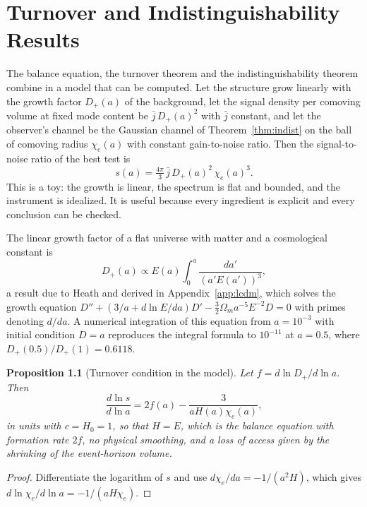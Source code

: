 \documentclass[11pt,oneside]{book}
\newtheorem{proposition}[theorem]{Proposition}
\theoremstyle{definition}
\theoremstyle{remark}
\begin{document}
\chapter{Turnover and Indistinguishability Results}\label{ch:turnover}

The balance equation, the turnover theorem and the indistinguishability theorem combine in a model that can be computed. Let the structure grow linearly with the growth factor $D_+(a)$ of the background, let the signal density per comoving volume at fixed mode content be $\bar j\,D_+(a)^2$ with $\bar j$ constant, and let the observer's channel be the Gaussian channel of Theorem~\ref{thm:indist} on the ball of comoving radius $\chi_e(a)$ with constant gain-to-noise ratio. Then the signal-to-noise ratio of the best test is
\[
s(a)=\tfrac{4\pi}{3}\,\bar j\,D_+(a)^2\,\chi_e(a)^3 .
\]
This is a toy: the growth is linear, the spectrum is flat and bounded, and the instrument is idealized. It is useful because every ingredient is explicit and every conclusion can be checked.

The linear growth factor of a flat universe with matter and a cosmological constant is
\[
D_+(a)\propto E(a)\int_0^a\frac{da'}{(a'E(a'))^3},
\]
a result due to Heath \cite{heath1977} and derived in Appendix~\ref{app:lcdm}, which solves the growth equation $D''+(3/a+d\ln E/da)D'-\tfrac32\Omega_m a^{-5}E^{-2}D=0$ with primes denoting $d/da$. A numerical integration of this equation from $a=10^{-3}$ with initial condition $D=a$ reproduces the integral formula to $10^{-11}$ at $a=0.5$, where $D_+(0.5)/D_+(1)=0.6118$.

\begin{proposition}[Turnover condition in the model]\label{prop:model-turnover}
Let $f=d\ln D_+/d\ln a$. Then
\[
\frac{d\ln s}{d\ln a}=2f(a)-\frac{3}{aH(a)\chi_e(a)} ,
\]
in units with $c=H_0=1$, so that $H=E$,
which is the balance equation with formation rate $2f$, no physical smoothing, and a loss of access given by the shrinking of the event-horizon volume.
\end{proposition}

\begin{proof}
Differentiate the logarithm of $s$ and use $d\chi_e/da=-1/(a^2H)$, which gives $d\ln\chi_e/d\ln a=-1/(aH\chi_e)$.
\end{proof}
\end{document}
